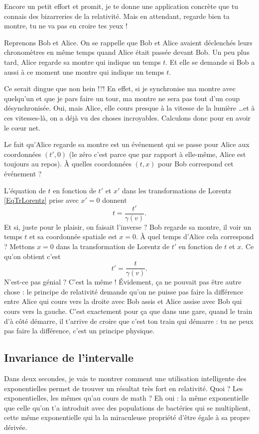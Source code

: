 Encore un petit effort et promit, je te donne une application concrète que tu connais des bizarreries de la relativité. Mais en attendant, regarde bien ta montre, tu ne va pas en croire tes yeux !

Reprenons Bob et Alice. On se rappelle que Bob et Alice avaient déclenchés leurs chronomètres en même temps quand Alice était passée devant Bob. Un peu plus tard, Alice regarde sa montre qui indique un temps $t$. Et elle se demande si Bob a aussi à ce moment une montre qui indique un temps $t$.

Ce serait dingue que non hein !?! En effet, si je synchronise ma montre avec quelqu'un et que je pars faire un tour, ma montre ne sera pas tout d'un coup  désynchronisée. Oui, mais Alice, elle cours presque à la vitesse de la lumière \ldots et à ces vitesses-là, on a déjà vu des choses incroyables. Calculons donc pour en avoir le c\oe ur net.

Le fait qu'Alice regarde sa montre est un événement qui se passe pour Alice aux coordonnées $(t',0)$ (le zéro c'est parce que par rapport à elle-même, Alice est toujours au repos). À quelles coordonnées $(t,x)$ pour Bob correspond cet événement ?

L'équation de $t$ en fonction de $t'$ et $x'$ dans les transformations de Lorentz \eqref{EqTrLorentz} prise avec $x'=0$ donnent
\[ 
  t=\frac{ t' }{ \gamma(v) }.
\]
Et si, juste pour le plaisir, on faisait l'inverse ? Bob regarde sa montre, il voir un temps $t$ et sa coordonnée spatiale est $x=0$. À quel temps d'Alice cela correspond ? Mettons $x=0$ dans la transformation de Lorentz de $t'$ en fonction de $t$ et $x$. Ce qu'on obtient c'est
\[ 
  	t'=\frac{ t }{ \gamma(v) }.
\]
N'est-ce pas génial ? C'est la même ! Évidement, ça ne pouvait pas être autre chose : le principe de relativité demande qu'on ne puisse pas faire la différence entre Alice qui cours vers la droite avec Bob assis et Alice assise avec Bob qui cours vers la gauche. C'est exactement pour ça que dans une gare, quand le train d'à côté démarre, il t'arrive de croire que c'est ton train qui démarre : tu ne peux pas faire la différence, c'est un principe physique.


\subsection{Invariance de l'intervalle}

Dans deux secondes, je vais te montrer comment une utilisation intelligente des exponentielles permet de trouver un résultat très fort en relativité. Quoi ? Les exponentielles, les mêmes qu'au cours de math ? Eh oui : la même exponentielle que celle qu'on t'a introduit avec des populations de bactéries qui se multiplient, cette même exponentielle qui la la miraculeuse propriété d'être égale à sa propre dérivée.

